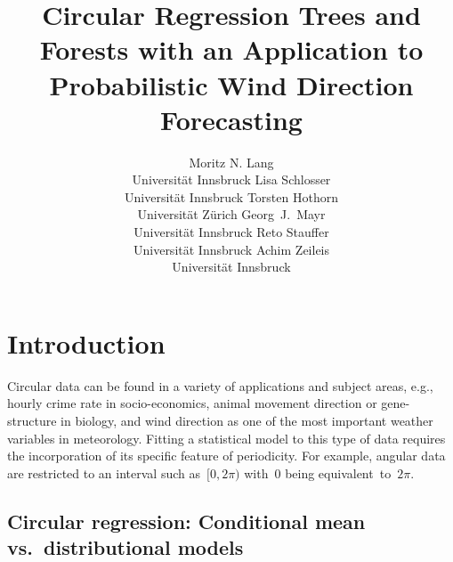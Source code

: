 \documentclass[nojss,shortnames]{jss}
\title{Circular Regression Trees and Forests with an Application to Probabilistic Wind Direction Forecasting}
\author{Moritz N. Lang\\Universit\"at Innsbruck
   \And Lisa Schlosser\\Universit\"at Innsbruck
   \And Torsten Hothorn\\Universit\"at Z\"urich
   \AND Georg~J.~Mayr\\Universit\"at Innsbruck
   \And Reto Stauffer\\Universit\"at Innsbruck
   \And Achim Zeileis\\Universit\"at Innsbruck}
\numberwithin{equation}{section}
\begin{document}
\section{Introduction}
\label{sec:introduction}

Circular data can be found in a variety of applications and subject areas,
e.g., hourly crime rate in socio-economics, animal movement direction or
gene-structure in biology, and wind direction as one of the most important
weather variables in meteorology. Fitting a statistical model to this type of
data requires the incorporation of its specific feature of periodicity. For
example, angular data are restricted to an interval such as~$[0,2\pi)$ with~$0$
being equivalent~to~$2\pi$.

\newpage

\subsection[Circular regression: Conditional mean vs. distributional models]{Circular regression: Conditional mean vs.\ distributional models}
\end{document}
